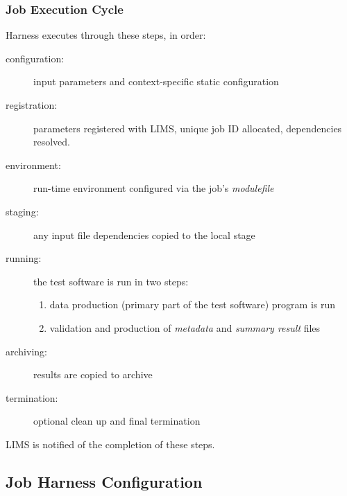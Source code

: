 \documentclass[xcolor=dvipsnames]{beamer}
\begin{document}
\begin{frame}
  \frametitle{Job Execution Cycle}
  Harness executes through these steps, in order:
  \begin{description}
  \item[configuration:] input parameters and context-specific static configuration
  \item[registration:] parameters registered with LIMS, unique job
    ID allocated, dependencies resolved.
  \item[environment:] run-time environment configured via the job's \textit{modulefile}
  \item[staging:] any input file dependencies copied to the local stage
  \item[running:] the test software is run in two steps:
    \begin{enumerate}
    \item data production (primary part of the test software) program is run
    \item validation and production of \textit{metadata} and
      \textit{summary result} files
    \end{enumerate}
  \item[archiving:] results are copied to archive
  \item[termination:] optional clean up and final termination
  \end{description}
  LIMS is notified of the completion of these steps.
\end{frame}

\subsection{Job Harness Configuration}
\end{document}
